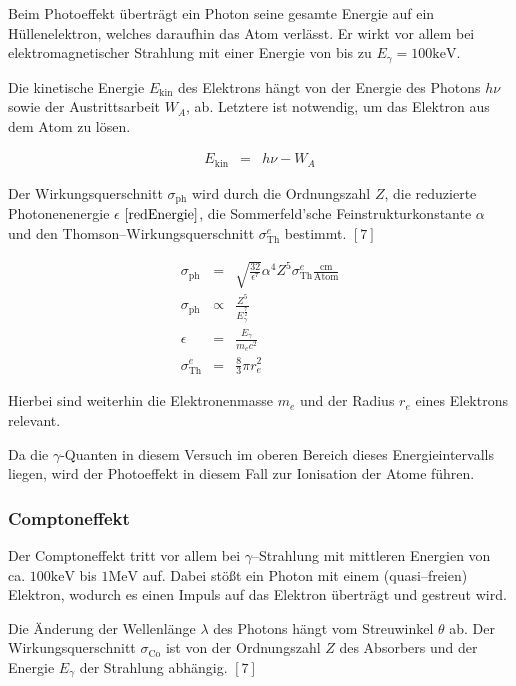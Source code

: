 \documentclass[12pt,a4paper]{scrartcl}
\numberwithin{equation}{section} %
\newcommand{\pu}[1]{\ensuremath{\mathrm{#1}}}
\renewcommand{\[}{} %
\renewcommand{\]}{\noindent} %
\begin{document}
Beim Photoeffekt überträgt ein Photon seine gesamte Energie auf ein
Hüllenelektron, welches daraufhin das Atom verlässt. Er wirkt vor allem
bei elektromagnetischer Strahlung mit einer Energie von bis zu
\(E_\gamma = \pu{100 keV}\).

Die kinetische Energie \(E_\mathrm{kin}\) des Elektrons hängt von der
Energie des Photons \(h\nu\) sowie der Austrittsarbeit \(W_A\), ab.
Letztere ist notwendig, um das Elektron aus dem Atom zu lösen.

\[
\begin{eqnarray}
    E_\mathrm{kin} &=& h\nu - W_A
\end{eqnarray}
\]

Der Wirkungsquerschnitt \(\sigma_\mathrm{ph}\) wird durch die
Ordnungszahl \(Z\), die reduzierte Photonenenergie \(\epsilon\)
\(\eqref{redEnergie}\), die Sommerfeld'sche Feinstrukturkonstante
\(\alpha\) und den Thomson--Wirkungsquerschnitt \(\sigma_\mathrm{Th}^e\)
bestimmt. \([7]\)

\[
\begin{eqnarray}
    \sigma_\mathrm{ph}
        &=& \sqrt{\frac{32}{\epsilon^7}}\alpha^4 Z^5
            \sigma_\mathrm{Th}^e \pu{\frac{cm}{Atom}} \\
    \sigma_\mathrm{ph}
        &\propto& \frac{Z^5}{E_\gamma^{\frac{7}{2}}} \\
    \epsilon &=& \frac{E_\gamma}{m_ec^2} \label{redEnergie} \\
    \sigma_\mathrm{Th}^e &=& \frac{8}{3} \pi r_e^2
\end{eqnarray}
\]

Hierbei sind weiterhin die Elektronenmasse \(m_e\) und der Radius
\(r_e\) eines Elektrons relevant.

Da die $\gamma$-Quanten in diesem Versuch im oberen Bereich dieses Energieintervalls liegen, wird der Photoeffekt in diesem Fall zur Ionisation der Atome führen.

\hypertarget{comptoneffekt}{%
\subsubsection{Comptoneffekt}\label{comptoneffekt}}

Der Comptoneffekt tritt vor allem bei \(\gamma\)--Strahlung mit
mittleren Energien von ca. \(\pu{100 keV}\) bis \(\pu{1 MeV}\) auf.
Dabei stößt ein Photon mit einem (quasi--freien) Elektron, wodurch es
einen Impuls auf das Elektron überträgt und gestreut wird.

Die Änderung der Wellenlänge \(\lambda\) des Photons hängt vom
Streuwinkel \(\theta\) ab. Der Wirkungsquerschnitt
\(\sigma_\mathrm{Co}\) ist von der Ordnungszahl \(Z\) des Absorbers und
der Energie \(E_\gamma\) der Strahlung abhängig. \([7]\)
\end{document}
